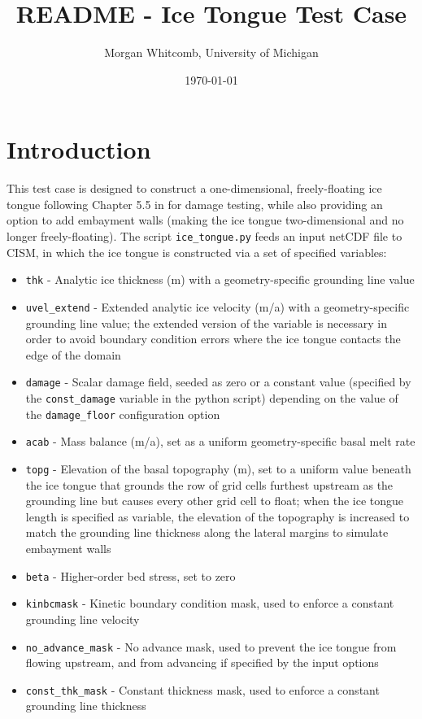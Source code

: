 \documentclass{article}
\title{README - Ice Tongue Test Case}
\author{Morgan Whitcomb, University of Michigan}
\date{\today}
\begin{document}
\maketitle

\section{Introduction}

This test case is designed to construct a one-dimensional, freely-floating ice tongue following Chapter 5.5 in \citet{van-der-Veen} for damage testing, while also providing an option to add embayment walls (making the ice tongue two-dimensional and no longer freely-floating). The script \texttt{ice\_tongue.py} feeds an input netCDF file to CISM, in which the ice tongue is constructed via a set of specified variables:
\begin{itemize}
   \item \texttt{thk} - Analytic ice thickness (m) with a geometry-specific grounding line value
   \item \texttt{uvel\_extend} - Extended analytic ice velocity (m/a) with a geometry-specific grounding line value; the extended version of the variable is necessary in order to avoid boundary condition errors where the ice tongue contacts the edge of the domain
   \item \texttt{damage} - Scalar damage field, seeded as zero or a constant value (specified by the \texttt{const\_damage} variable in the python script) depending on the value of the \texttt{damage\_floor} configuration option
   \item \texttt{acab} - Mass balance (m/a), set as a uniform geometry-specific basal melt rate
   \item \texttt{topg} - Elevation of the basal topography (m), set to a uniform value beneath the ice tongue that grounds the row of grid cells furthest upstream as the grounding line but causes every other grid cell to float; when the ice tongue length is specified as variable, the elevation of the topography is increased to match the grounding line thickness along the lateral margins to simulate embayment walls
   \item \texttt{beta} - Higher-order bed stress, set to zero
   \item \texttt{kinbcmask} - Kinetic boundary condition mask, used to enforce a constant grounding line velocity
   \item \texttt{no\_advance\_mask} - No advance mask, used to prevent the ice tongue from flowing upstream, and from advancing if specified by the input options
   \item \texttt{const\_thk\_mask} - Constant thickness mask, used to enforce a constant grounding line thickness
\end{itemize}
\end{document}
